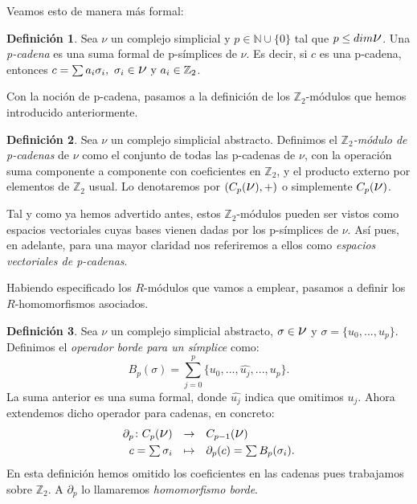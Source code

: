 \documentclass[12pt, a4paper, twoside]{book}
\numberwithin{equation}{section}
\theoremstyle{definition}
\newtheorem{defi}{Definición}[section]
\theoremstyle{remark}
\theoremstyle{plain}
\begin{document}
	Veamos esto de manera más formal:

	\begin{defi}
		Sea {\Large $\nu$} un complejo simplicial y $p \in \mathbb{N}
		\cup\{0\}$ 
		tal que $p\leq dim \text{{\Large $\nu$}}$. Una 
		\textit{p-cadena} es una suma formal de p-símplices de 
		{\Large $\nu$}. Es decir, si $c$ es una p-cadena, entonces 
		$c=\sum a_{i}\sigma_{i},\ \sigma_{i} \in 
		\text{{\Large $\nu$}}\text{ y } 
		a_{i} \in \mathbb{Z}_{2}$. 
	\end{defi}
	
	Con la noción de p-cadena, pasamos a la definición de los 
	$\mathbb{Z}_{2}$-módulos que hemos introducido anteriormente.
	\begin{defi}
		Sea {\Large $\nu$} un complejo simplicial abstracto. Definimos
		el \textit{$\mathbb{Z}_{2}$-módulo de p-cadenas} de 
		{\Large $\nu$} como el conjunto de todas las p-cadenas de 
		{\Large $\nu$}, con la operación suma componente a componente 
		con coeficientes en $\mathbb{Z}_{2}$, y el producto externo 
		por elementos de $\mathbb{Z}_{2}$ usual. Lo denotaremos por 
		$(C_{p}(\text{{\Large $\nu$}}), +)$ o simplemente 
		$C_{p}(\text{{\Large $\nu$}})$. 	
	\end{defi}
	
	Tal y como ya hemos advertido antes, estos $\mathbb{Z}_{2}$-módulos 
	pueden ser vistos como espacios vectoriales cuyas bases vienen dadas 
	por los p-símplices de {\Large $\nu$}. Así pues, en adelante, para una 
	mayor claridad nos referiremos a ellos como \emph{espacios 
	vectoriales de p-cadenas}.

	Habiendo especificado los $R$-módulos que vamos a emplear, pasamos a
	definir los $R$-homomorfismos asociados.

	\begin{defi}
		Sea {\Large $\nu$} un complejo simplicial abstracto, $\sigma 
		\in \text{{\Large $\nu$}}$ y $\sigma = \{u_{0},...,u_{p}\}$. 
		Definimos el \textit{operador borde para un símplice}
		como:
		$$
		B_{p}(\sigma)=\displaystyle 
		\sum_{j=0}^{p}\{u_{0},...,\widehat{u_{j}},...,u_{p}\}.
		$$
 		La suma anterior es una suma formal, donde $\widehat{u_{j}}$ 
		indica que omitimos $u_{j}$. Ahora extendemos dicho operador 
		para cadenas, en concreto:
	\begin{equation}
		\label{def:borde_form}
		\begin{array}{lll}
			\partial_{p}\colon C_{p}(\text{{\Large $\nu$}}) & 
				\rightarrow & C_{p-1}(\text{{\Large $\nu$}})
				\\[3pt] 
			\multicolumn{1}{r}{c=\sum\sigma_{i}} & \mapsto & 
			\partial_{p}(c)=\sum B_{p}(\sigma_{i}).
		\end{array}
	\end{equation}
	En esta definición hemos omitido los coeficientes en las cadenas pues
	trabajamos sobre $\mathbb{Z}_{2}$. A $\partial_{p}$ lo llamaremos 
	\textit{homomorfismo borde}.	
	\end{defi}
\end{document}
